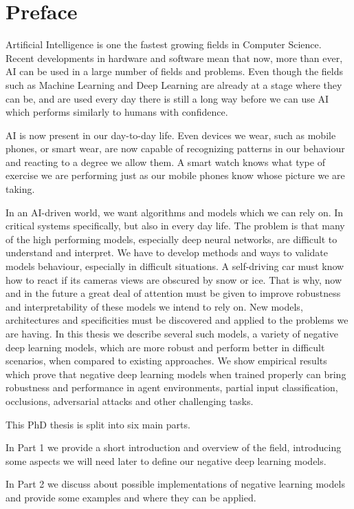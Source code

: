 \documentclass[b5paper]{book}
\begin{document}
\chapter{Preface}

Artificial Intelligence is one the fastest growing fields in Computer Science. Recent developments in hardware and software mean that now, more than ever, AI can be used in a large number of fields and problems. Even though the fields such as Machine Learning and Deep Learning are already at a stage where they can be, and are used every day there is still a long way before we can use AI which performs similarly to humans with confidence. 

AI is now present in our day-to-day life. Even devices we wear, such as mobile phones, or smart wear, are now capable of recognizing patterns in our behaviour and reacting to a degree we allow them. A smart watch knows what type of exercise we are performing just as our mobile phones know whose picture we are taking. 

In an AI-driven world, we want algorithms and models which we can rely on. In critical systems specifically, but also in every day life. The problem is that many of the high performing models, especially deep neural networks, are difficult to understand and interpret. We have to develop methods and ways to validate models behaviour, especially in difficult situations. A self-driving car must know how to react if its cameras views are obscured by snow or ice. That is why, now and in the future a great deal of attention must be given to improve robustness and interpretability of these models we intend to rely on. New models, architectures and specificities must be discovered and applied to the problems we are having. In this thesis we describe several such models, a variety of negative deep learning models, which are more robust and perform better in difficult scenarios, when compared to existing approaches. We show empirical results which prove that negative deep learning models when trained properly can bring robustness and performance in agent environments, partial input classification, occlusions, adversarial attacks and other challenging tasks.

This PhD thesis is split into six main parts.

In Part 1 we provide a short introduction and overview of the field, introducing some aspects we will need later to define our negative deep learning models.

In Part 2 we discuss about possible implementations of negative learning models and provide some examples and where they can be applied.
\end{document}
